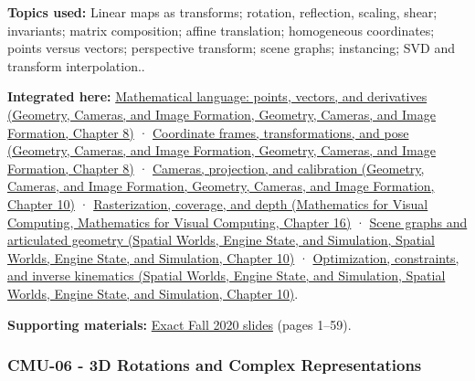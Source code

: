 \textbf{Topics used:} Linear maps as transforms; rotation, reflection, scaling, shear; invariants; matrix composition; affine translation; homogeneous coordinates; points versus vectors; perspective transform; scene graphs; instancing; SVD and transform interpolation..

\textbf{Integrated here:} \href{../03-Geometry-Cameras-and-Image-Formation/main.pdf\#nameddest=03-visual-computing-i-ch001-mathematical-language-points-vectors-and-derivatives}{Mathematical language: points, vectors, and derivatives (Geometry, Cameras, and Image Formation, Geometry, Cameras, and Image Formation, Chapter 8)} · \href{../03-Geometry-Cameras-and-Image-Formation/main.pdf\#nameddest=03-visual-computing-i-ch001-coordinate-frames-transformations-and-pose}{Coordinate frames, transformations, and pose (Geometry, Cameras, and Image Formation, Geometry, Cameras, and Image Formation, Chapter 8)} · \href{../03-Geometry-Cameras-and-Image-Formation/main.pdf\#nameddest=03-visual-computing-i-ch003-cameras-projection-and-calibration}{Cameras, projection, and calibration (Geometry, Cameras, and Image Formation, Geometry, Cameras, and Image Formation, Chapter 10)} · \href{../02-Mathematics-for-Visual-Computing/main.pdf\#nameddest=03-visual-computing-i-ch012-rasterization-coverage-and-depth}{Rasterization, coverage, and depth (Mathematics for Visual Computing, Mathematics for Visual Computing, Chapter 16)} · \href{../05-Spatial-Worlds-Engine-State-and-Simulation/main.pdf\#nameddest=04-visual-computing-ii-ch029-scene-graphs-and-articulated-geometry}{Scene graphs and articulated geometry (Spatial Worlds, Engine State, and Simulation, Spatial Worlds, Engine State, and Simulation, Chapter 10)} · \href{../05-Spatial-Worlds-Engine-State-and-Simulation/main.pdf\#nameddest=04-visual-computing-ii-ch029-optimization-constraints-and-inverse-kinematics}{Optimization, constraints, and inverse kinematics (Spatial Worlds, Engine State, and Simulation, Spatial Worlds, Engine State, and Simulation, Chapter 10)}.

\textbf{Supporting materials:} \href{https://15462.courses.cs.cmu.edu/fall2020content/lectures/05_transformations/05_transformations_slides.pdf}{Exact Fall 2020 slides} (pages 1--59).

\subsubsection{CMU-06 - 3D Rotations and Complex Representations}\label{04-visual-computing-ii-ch036-cmu-06---3d-rotations-and-complex-representations}

